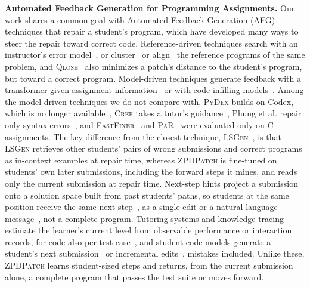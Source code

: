 \documentclass[conference]{IEEEtran}
\begin{document}
\noindent\textbf{Automated Feedback Generation for Programming Assignments.} Our work shares a common goal with Automated Feedback Generation (AFG) techniques that repair a student's program, which have developed many ways to steer the repair toward correct code. Reference-driven techniques search with an instructor's error model~\cite{singh2013automated}, or cluster~\cite{gulwani2018automated} or align~\cite{wang2018search,ahmed2022verifix} the reference programs of the same problem, and \textsc{Qlose}~\cite{d2016qlose} also minimizes a patch's distance to the student's program, but toward a correct program. Model-driven techniques generate feedback with a transformer given assignment information~\cite{heo2023referent} or with code-infilling models~\cite{koutcheme2023automated}. Among the model-driven techniques we do not compare with, \textsc{PyDex} builds on Codex, which is no longer available~\cite{zhang2024pydex}, \textsc{Cref} takes a tutor's guidance~\cite{yang2024cref}, Phung et al. repair only syntax errors~\cite{phung2023generating}, and \textsc{FastFixer}~\cite{liu2024fastfixer} and \textsc{PaR}~\cite{zhao2026peer} were evaluated only on C assignments. The key difference from the closest technique, \textsc{LSGen}~\cite{dai2026learner}, is that \textsc{LSGen} retrieves other students' pairs of wrong submissions and correct programs as in-context examples at repair time, whereas \textsc{ZPDPatch} is fine-tuned on students' own later submissions, including the forward steps it mines, and reads only the current submission at repair time. Next-step hints project a submission onto a solution space built from past students' paths, so students at the same position receive the same next step~\cite{barnes2008toward,paassen2017continuous,piech2015autonomously,rivers2017data,price2017isnap}, as a single edit or a natural-language message~\cite{roest2024next}, not a complete program. Tutoring systems and knowledge tracing estimate the learner's current level from observable performance or interaction records, for code also per test case~\cite{murray2002toward,chounta2017grey,schulze2024beyond,corbett1994knowledge,piech2015deep,duan2025test}, and student-code models generate a student's next submission~\cite{liu2022open} or incremental edits~\cite{miroyan2025parastudent}, mistakes included. Unlike these, \textsc{ZPDPatch} learns student-sized steps and returns, from the current submission alone, a complete program that passes the test suite or moves forward.
\end{document}
